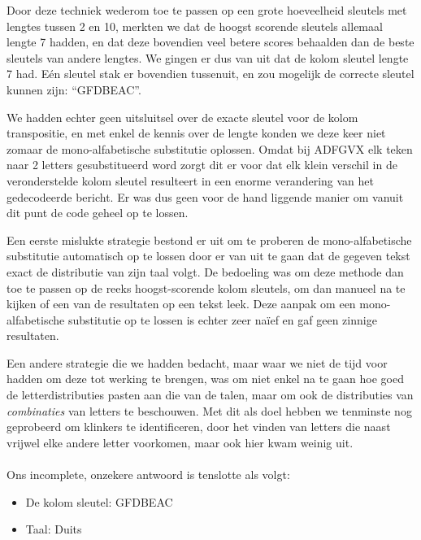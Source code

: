 \documentclass[fleqn]{article}
\begin{document}
	Door deze techniek wederom toe te passen op een grote hoeveelheid sleutels met lengtes tussen 2 en 10, merkten we dat de hoogst scorende sleutels allemaal lengte 7 hadden, en dat deze bovendien veel betere scores behaalden dan de beste sleutels van andere lengtes. We gingen er dus van uit dat de kolom sleutel lengte 7 had. E\'en sleutel stak er bovendien tussenuit, en zou mogelijk de correcte sleutel kunnen zijn: ``GFDBEAC''.
	
	We hadden echter geen uitsluitsel over de exacte sleutel voor de kolom transpositie, en met enkel de kennis over de lengte konden we deze keer niet zomaar de mono-alfabetische substitutie oplossen. Omdat bij ADFGVX elk teken naar 2 letters gesubstitueerd word zorgt dit er voor dat elk klein verschil in de veronderstelde kolom sleutel resulteert in een enorme verandering van het gedecodeerde bericht. Er was dus geen voor de hand liggende manier om vanuit dit punt de code geheel op te lossen.
	
	Een eerste mislukte strategie bestond er uit om te proberen de mono-alfabetische substitutie automatisch op te lossen door er van uit te gaan dat de gegeven tekst exact de distributie van zijn taal volgt. De bedoeling was om deze methode dan toe te passen op de reeks hoogst-scorende kolom sleutels, om dan manueel na te kijken of een van de resultaten op een tekst leek. Deze aanpak om een mono-alfabetische substitutie op te lossen is echter zeer na\"ief en gaf geen zinnige resultaten.
	
	Een andere strategie die we hadden bedacht, maar waar we niet de tijd voor hadden om deze tot werking te brengen, was om niet enkel na te gaan hoe goed de letterdistributies pasten aan die van de talen, maar om ook de distributies van \textit{combinaties} van letters te beschouwen. Met dit als doel hebben we tenminste nog geprobeerd om klinkers te identificeren, door het vinden van letters die naast vrijwel elke andere letter voorkomen, maar ook hier kwam weinig uit.\\\\	
	Ons incomplete, onzekere antwoord is tenslotte als volgt:
	\begin{itemize}
		\setlength\itemsep{0pt}
		\item De kolom sleutel: GFDBEAC
		\item Taal: Duits
	\end{itemize}
	
\end{document}
